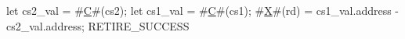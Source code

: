 let cs2_val = #\hyperref[sailRISCVzC]{C}#(cs2);
let cs1_val = #\hyperref[sailRISCVzC]{C}#(cs1);
#\hyperref[sailRISCVzX]{X}#(rd) = cs1_val.address - cs2_val.address;
RETIRE_SUCCESS
